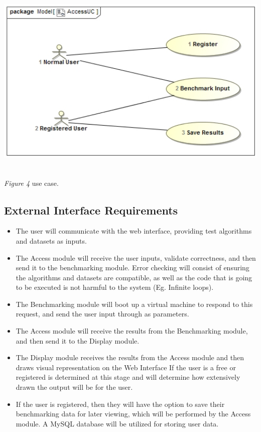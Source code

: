 \documentclass[runningheads,a4paper]{article}
\begin{document}
        \includegraphics[width=15cm , height=10cm]{AccessUC.jpg}
        \newline 
        \textit{Figure 4} use case.
        \newline
        
    
   
	\subsection{External Interface Requirements}
		\begin{itemize}
			\item The user will communicate with the web interface, providing test algorithms and datasets as inputs.
			\item The Access module will receive the user inputs, validate correctness, and then send it to the benchmarking module. \newline
				Error checking will consist of ensuring the algorithms and datasets are compatible, as well as the code that is going to be executed is not harmful to the system (Eg. Infinite loops).
			\item The Benchmarking module will boot up a virtual machine to respond to this request, and send the user input through as parameters.
			\item The Access module will receive the results from the Benchmarking module, and then send it to the Display module.
			\item The Display module receives the results from the Access module and then draws visual representation on the Web Interface \newline
				If the user is a free or registered is determined at this stage and will determine how extensively drawn the output will be for the user.
			\item If the user is registered, then they will have the option to save their benchmarking data for later viewing, which will be performed by the Access module. \newline
				A MySQL database will be utilized for storing user data.
		\end{itemize}
	
\end{document}
